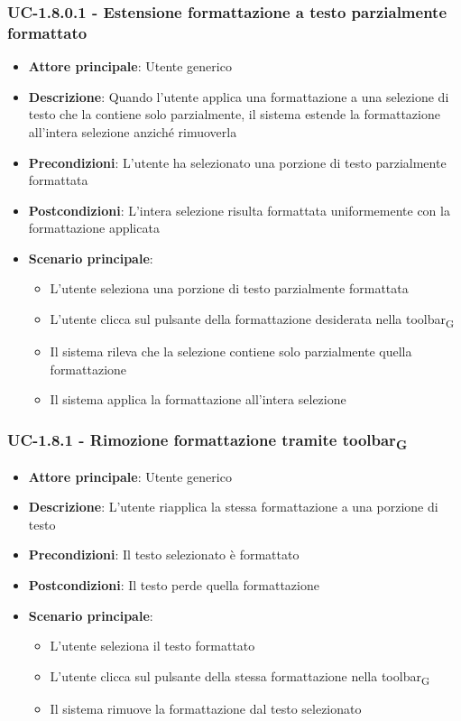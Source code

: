 \documentclass[11pt,a4paper]{article}
\newcommand{\gls}[1]{#1\textsubscript{G}}
\begin{document}
\subsubsection{UC-1.8.0.1 - Estensione formattazione a testo parzialmente formattato}
\begin{itemize}
    \item \textbf{Attore principale}: Utente generico
    \item \textbf{Descrizione}: Quando l'utente applica una formattazione a una selezione di testo che la contiene solo parzialmente, il sistema estende la formattazione all'intera selezione anziché rimuoverla
    \item \textbf{Precondizioni}: L'utente ha selezionato una porzione di testo parzialmente formattata
    \item \textbf{Postcondizioni}: L'intera selezione risulta formattata uniformemente con la formattazione applicata
    \item \textbf{Scenario principale}:
        \begin{itemize}
            \item L'utente seleziona una porzione di testo parzialmente formattata
            \item L'utente clicca sul pulsante della formattazione desiderata nella \gls{toolbar}
            \item Il sistema rileva che la selezione contiene solo parzialmente quella formattazione
            \item Il sistema applica la formattazione all'intera selezione
        \end{itemize}
\end{itemize}

\subsubsection{UC-1.8.1 - Rimozione formattazione tramite \gls{toolbar}}
\begin{itemize}
    \item \textbf{Attore principale}: Utente generico
    \item \textbf{Descrizione}: L'utente riapplica la stessa formattazione a una porzione di testo
    \item \textbf{Precondizioni}: Il testo selezionato è formattato
    \item \textbf{Postcondizioni}: Il testo perde quella formattazione
    \item \textbf{Scenario principale}:
        \begin{itemize}
            \item L'utente seleziona il testo formattato
            \item L'utente clicca sul pulsante della stessa formattazione nella \gls{toolbar}
            \item Il sistema rimuove la formattazione dal testo selezionato
        \end{itemize}
\end{itemize}
\end{document}

